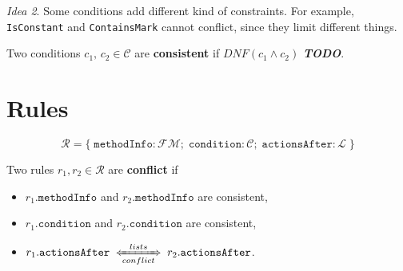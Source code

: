 \documentclass{article}
\newcommand{\cLists}{\xLeftrightarrow[conflict]{lists}}
\begin{document}
\noindent \textit{Idea 2}. Some conditions add different kind of constraints. For example, \texttt{IsConstant} and \texttt{ContainsMark} cannot conflict, since they limit different things.

Two conditions $c_1,\, c_2 \in \mathcal{C}$ are \textbf{consistent} if $DNF(c_1 \land c_2)$ \textbf{\textit{TODO}}.

\section{Rules}
\[
\mathcal{R} = \{\; \texttt{methodInfo} : \mathcal{FM};\; \texttt{condition} : \mathcal{C};\; \texttt{actionsAfter} : \mathcal{L}\;\}
\]

\noindent Two rules $r_1, r_2 \in \mathcal{R}$ are \textbf{conflict} if
\begin{itemize}
    \item $r_1.\texttt{methodInfo}$ and $r_2.\texttt{methodInfo}$ are consistent,
    \item $r_1.\texttt{condition}$ and $r_2.\texttt{condition}$ are consistent,
    \item $r_1.\texttt{actionsAfter} \;\cLists\; r_2.\texttt{actionsAfter}$.
\end{itemize}
\end{document}
